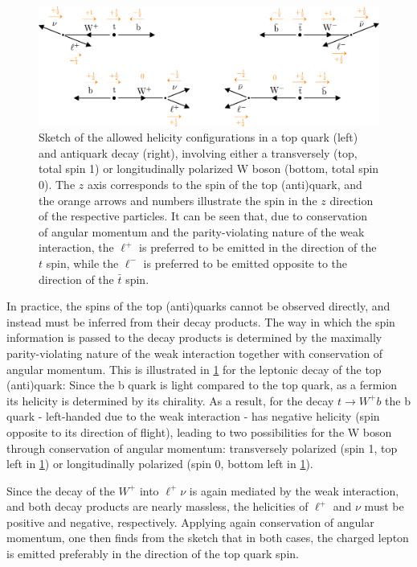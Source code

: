 \begin{figure}[t]
    \centering
    \includegraphics[width=0.95\linewidth]{figures/spin_corrs_sketch.pdf}
    \caption{Sketch of the allowed helicity configurations in a top quark (left) and antiquark decay (right), involving either a transversely (top, total spin 1) or longitudinally polarized W boson (bottom, total spin 0). The $z$ axis corresponds to the spin of the top (anti)quark, and the orange arrows and numbers illustrate the spin in the $z$ direction of the respective particles. It can be seen that, due to conservation of angular momentum and the parity-violating nature of the weak interaction, the $\ell^+$ is preferred to be emitted in the direction of the $t$ spin, while the $\ell^-$ is preferred to be emitted opposite to the direction of the $\bar{t}$ spin.}
    \label{fig:theory:topspin}
\end{figure}

In practice, the spins of the top (anti)quarks cannot be observed directly, and instead must be inferred from their decay products. The way in which the spin information is passed to the decay products is determined by the maximally parity-violating nature of the weak interaction together with conservation of angular momentum. This is illustrated in \cref{fig:theory:topspin} for the leptonic decay of the top (anti)quark: Since the b quark is light compared to the top quark, as a fermion its helicity is determined by its chirality. As a result, for the decay $t \rightarrow W^+ b$ the b quark - left-handed due to the weak interaction - has negative helicity (spin opposite to its direction of flight), leading to two possibilities for the W boson through conservation of angular momentum: transversely polarized (spin 1, top left in \cref{fig:theory:topspin}) or longitudinally polarized (spin 0, bottom left in \cref{fig:theory:topspin}).

Since the decay of the $W^+$ into $\ell^+ \nu$ is again mediated by the weak interaction, and both decay products are nearly massless, the helicities of $\ell^+$ and $\nu$ must be positive and negative, respectively. Applying again conservation of angular momentum, one then finds from the sketch that in both cases, the charged lepton is emitted preferably in the direction of the top quark spin. 

